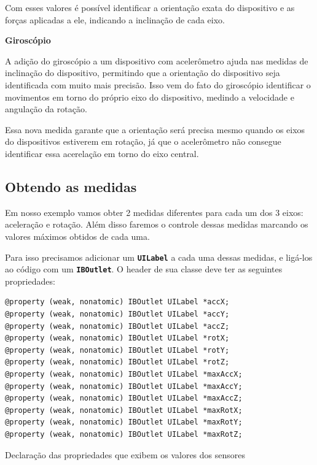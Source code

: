 \documentclass[a4paper,12pt,brazil,doubleside]{book}
\begin{document}
\begin{singlespace}
Com esses valores é possível identificar a orientação exata do dispositivo e as forças aplicadas a ele, indicando a inclinação de cada eixo.

\bigskip	


\textbf{Giroscópio}


A adição do giroscópio a um dispositivo com acelerômetro ajuda nas medidas de inclinação do dispositivo, permitindo que a orientação do dispositivo seja identificada com muito mais precisão. Isso vem do fato do giroscópio identificar o movimentos em torno do próprio eixo do dispositivo, medindo a velocidade e angulação da rotação.

Essa nova medida garante que a orientação será precisa mesmo quando os eixos do dispositivos estiverem em rotação, já que o acelerômetro não consegue identificar essa acerelação em torno do eixo central.

\bigskip

\subsection{Obtendo as medidas}


Em nosso exemplo vamos obter 2 medidas diferentes para cada um dos 3 eixos: aceleração e rotação. Além disso faremos o controle dessas medidas marcando os valores máximos obtidos de cada uma.

Para isso precisamos adicionar um \texttt{\textbf{UILabel}} a cada uma dessas medidas, e ligá-los ao código com um \texttt{\textbf{IBOutlet}}. O header de sua classe deve ter as seguintes propriedades:

\begin{listing}[H]
\begin{verbatim}
@property (weak, nonatomic) IBOutlet UILabel *accX;
@property (weak, nonatomic) IBOutlet UILabel *accY;
@property (weak, nonatomic) IBOutlet UILabel *accZ;
@property (weak, nonatomic) IBOutlet UILabel *rotX;
@property (weak, nonatomic) IBOutlet UILabel *rotY;
@property (weak, nonatomic) IBOutlet UILabel *rotZ;
@property (weak, nonatomic) IBOutlet UILabel *maxAccX;
@property (weak, nonatomic) IBOutlet UILabel *maxAccY;
@property (weak, nonatomic) IBOutlet UILabel *maxAccZ;
@property (weak, nonatomic) IBOutlet UILabel *maxRotX;
@property (weak, nonatomic) IBOutlet UILabel *maxRotY;
@property (weak, nonatomic) IBOutlet UILabel *maxRotZ;
\end{verbatim}
\caption{Declaração das propriedades que exibem os valores dos sensores}
\end{listing}



\end{singlespace}
\end{document}

